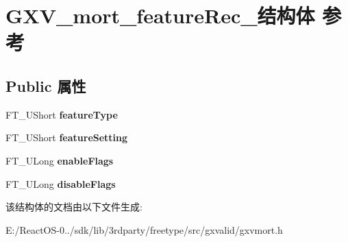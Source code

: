\hypertarget{struct_g_x_v__mort__feature_rec__}{}\section{G\+X\+V\+\_\+mort\+\_\+feature\+Rec\+\_\+结构体 参考}
\label{struct_g_x_v__mort__feature_rec__}
\subsection*{Public 属性}
\begin{DoxyCompactItemize}
\item 
\mbox{\label{struct_g_x_v__mort__feature_rec___a07d7f63dcf3fd92f905dbf98718b6ad1}} 
F\+T\+\_\+\+U\+Short {\bfseries feature\+Type}
\item 
\mbox{\label{struct_g_x_v__mort__feature_rec___a3575387e97873c27e87f39def7af8537}} 
F\+T\+\_\+\+U\+Short {\bfseries feature\+Setting}
\item 
\mbox{\label{struct_g_x_v__mort__feature_rec___ae9ff6e1c398afdd2a72791c1af7e3157}} 
F\+T\+\_\+\+U\+Long {\bfseries enable\+Flags}
\item 
\mbox{\label{struct_g_x_v__mort__feature_rec___a45e12ac919f6ef9db0b1b21a5edac95b}} 
F\+T\+\_\+\+U\+Long {\bfseries disable\+Flags}
\end{DoxyCompactItemize}


该结构体的文档由以下文件生成\+:\begin{DoxyCompactItemize}
\item 
E\+:/\+React\+O\+S-\/0../sdk/lib/3rdparty/freetype/src/gxvalid/gxvmort.\+h\end{DoxyCompactItemize}
